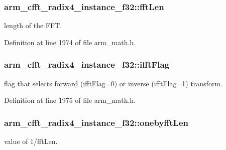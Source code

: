 \hypertarget{structarm__cfft__radix4__instance__f32_a7e6a6d290ce158ce9a15a45e364b021a}{
\subsubsection[{fft\-Len}]{ arm\-\_\-cfft\-\_\-radix4\-\_\-instance\-\_\-f32\-::fft\-Len}}\label{structarm__cfft__radix4__instance__f32_a7e6a6d290ce158ce9a15a45e364b021a}
length of the F\-F\-T. 

Definition at line 1974 of file arm\-\_\-math.\-h.

\hypertarget{structarm__cfft__radix4__instance__f32_a25d1da64dd6487c291f04d226f9acc66}{
\subsubsection[{ifft\-Flag}]{ arm\-\_\-cfft\-\_\-radix4\-\_\-instance\-\_\-f32\-::ifft\-Flag}}\label{structarm__cfft__radix4__instance__f32_a25d1da64dd6487c291f04d226f9acc66}
flag that selects forward (ifft\-Flag=0) or inverse (ifft\-Flag=1) transform. 

Definition at line 1975 of file arm\-\_\-math.\-h.

\hypertarget{structarm__cfft__radix4__instance__f32_ab9eed39e40b8d7c16381fbccf84467cd}{
\subsubsection[{onebyfft\-Len}]{ arm\-\_\-cfft\-\_\-radix4\-\_\-instance\-\_\-f32\-::onebyfft\-Len}}\label{structarm__cfft__radix4__instance__f32_ab9eed39e40b8d7c16381fbccf84467cd}
value of 1/fft\-Len. 

